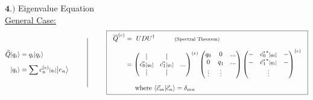 \documentclass[12pt]{article}
\begin{document}
\newpage \noindent
\(\boldsymbol{4.)}\) Eigenvalue Equation\\[10pt]
\underline{General Case:}
\[
    \begin{aligned}
        \widehat{Q} | q_i \rangle &= q_i | q_i \rangle\\[5pt] 
        | q_i \rangle &= \sum c^{(e)}_n{\scriptstyle[q_i]} \big| e_n \big\rangle 
    \end{aligned}
    \hspace{1cm}
    \rule[-35pt]{.5pt}{75pt}
    \hspace{1cm}
    \boxed{\begin{aligned}
        \ \ \overline{Q}^{(e)} &= \ U D U^{\dagger} \indent\indent \text{\scriptsize(Spectral Theorem)} \\[5pt]
        &= \left(\begin{matrix} 
                |   & |   &    \\
                \vec{c_0}{\scriptstyle[q_0]} & \vec{c_1}{\scriptstyle[q_1]} & ... \\
                |   & |   & 
            \end{matrix}\right)^{(e)}
            \left(\begin{matrix} 
                q_0   & 0         & ...\\
                0           & q_1 & ...\\
                \vdots      & \vdots    & 
            \end{matrix}\right)
            \left(\begin{matrix} 
                - & \vec{c_0}^*{\scriptstyle[q_0]}     & - \\
                - & \vec{c_1}^*{\scriptstyle[q_1]}     & - \\
                & \vdots  &  \\
            \end{matrix}\right)^{(e)} \ \ \\[5pt]
        & \indent \text{where } \langle \vec{c}_m | \vec{c}_n \rangle = \delta_{mn} 
    \end{aligned}}
\]
\end{document}
